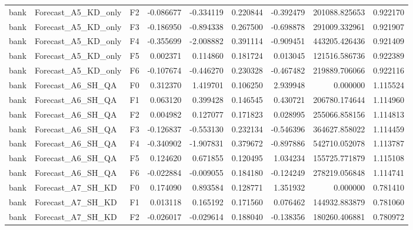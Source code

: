 \begin{tabular}{lllrrrrrr}
      bank &          Forecast\_A5\_KD\_only &  F2 & -0.086677 & -0.334119 & 0.220844 & -0.392479 &    201088.825653 &             0.922170 \\
      bank &          Forecast\_A5\_KD\_only &  F3 & -0.186950 & -0.894338 & 0.267500 & -0.698878 &    291009.332961 &             0.921907 \\
      bank &          Forecast\_A5\_KD\_only &  F4 & -0.355699 & -2.008882 & 0.391114 & -0.909451 &    443205.426436 &             0.921409 \\
      bank &          Forecast\_A5\_KD\_only &  F5 &  0.002371 &  0.114860 & 0.181724 &  0.013045 &    121516.586736 &             0.922389 \\
      bank &          Forecast\_A5\_KD\_only &  F6 & -0.107674 & -0.446270 & 0.230328 & -0.467482 &    219889.706066 &             0.922116 \\
      bank &            Forecast\_A6\_SH\_QA &  F0 &  0.312370 &  1.419701 & 0.106250 &  2.939948 &         0.000000 &             1.115524 \\
      bank &            Forecast\_A6\_SH\_QA &  F1 &  0.063120 &  0.399428 & 0.146545 &  0.430721 &    206780.174644 &             1.114960 \\
      bank &            Forecast\_A6\_SH\_QA &  F2 &  0.004982 &  0.127077 & 0.171823 &  0.028995 &    255066.858156 &             1.114813 \\
      bank &            Forecast\_A6\_SH\_QA &  F3 & -0.126837 & -0.553130 & 0.232134 & -0.546396 &    364627.858022 &             1.114459 \\
      bank &            Forecast\_A6\_SH\_QA &  F4 & -0.340902 & -1.907831 & 0.379672 & -0.897886 &    542710.052078 &             1.113787 \\
      bank &            Forecast\_A6\_SH\_QA &  F5 &  0.124620 &  0.671855 & 0.120495 &  1.034234 &    155725.771879 &             1.115108 \\
      bank &            Forecast\_A6\_SH\_QA &  F6 & -0.022884 & -0.009055 & 0.184180 & -0.124249 &    278219.056848 &             1.114741 \\
      bank &            Forecast\_A7\_SH\_KD &  F0 &  0.174090 &  0.893584 & 0.128771 &  1.351932 &         0.000000 &             0.781410 \\
      bank &            Forecast\_A7\_SH\_KD &  F1 &  0.013118 &  0.165192 & 0.171560 &  0.076462 &    144932.883879 &             0.781060 \\
      bank &            Forecast\_A7\_SH\_KD &  F2 & -0.026017 & -0.029614 & 0.188040 & -0.138356 &    180260.406881 &             0.780972 \\

\end{tabular}

